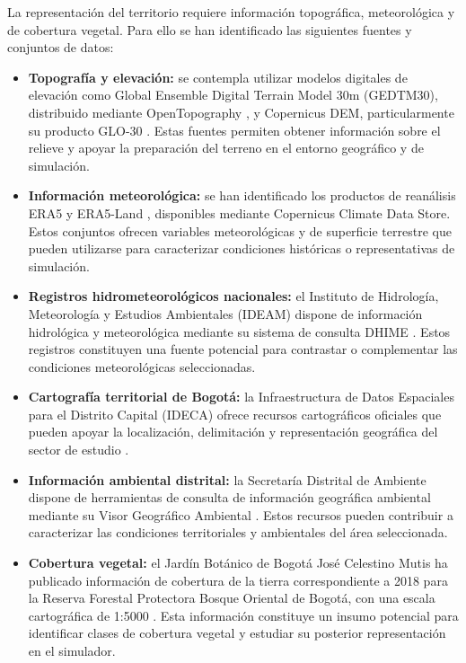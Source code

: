 La representación del territorio requiere información topográfica, meteorológica y de cobertura vegetal. Para ello se han identificado las siguientes fuentes y conjuntos de datos:

\begin{itemize}
    \item \textbf{Topografía y elevación:} se contempla utilizar modelos digitales de elevación como Global Ensemble Digital Terrain Model 30m (GEDTM30), distribuido mediante OpenTopography \cite{vfpGEDTM30}, y Copernicus DEM, particularmente su producto GLO-30 \cite{vfpCopernicusDEM}. Estas fuentes permiten obtener información sobre el relieve y apoyar la preparación del terreno en el entorno geográfico y de simulación.

    \item \textbf{Información meteorológica:} se han identificado los productos de reanálisis ERA5 \cite{vfpERA5Datos} y ERA5-Land \cite{vfpERA5LandDatos}, disponibles mediante Copernicus Climate Data Store. Estos conjuntos ofrecen variables meteorológicas y de superficie terrestre que pueden utilizarse para caracterizar condiciones históricas o representativas de simulación.

    \item \textbf{Registros hidrometeorológicos nacionales:} el Instituto de Hidrología, Meteorología y Estudios Ambientales (IDEAM) dispone de información hidrológica y meteorológica mediante su sistema de consulta DHIME \cite{vfpIDEAMDHIME}. Estos registros constituyen una fuente potencial para contrastar o complementar las condiciones meteorológicas seleccionadas.

    \item \textbf{Cartografía territorial de Bogotá:} la Infraestructura de Datos Espaciales para el Distrito Capital (IDECA) ofrece recursos cartográficos oficiales que pueden apoyar la localización, delimitación y representación geográfica del sector de estudio \cite{vfpIDECABogota}.

    \item \textbf{Información ambiental distrital:} la Secretaría Distrital de Ambiente dispone de herramientas de consulta de información geográfica ambiental mediante su Visor Geográfico Ambiental \cite{vfpSDAVisor}. Estos recursos pueden contribuir a caracterizar las condiciones territoriales y ambientales del área seleccionada.

    \item \textbf{Cobertura vegetal:} el Jardín Botánico de Bogotá José Celestino Mutis ha publicado información de cobertura de la tierra correspondiente a 2018 para la Reserva Forestal Protectora Bosque Oriental de Bogotá, con una escala cartográfica de 1:5000 \cite{vfpJBBCoberturas}. Esta información constituye un insumo potencial para identificar clases de cobertura vegetal y estudiar su posterior representación en el simulador.
\end{itemize}

